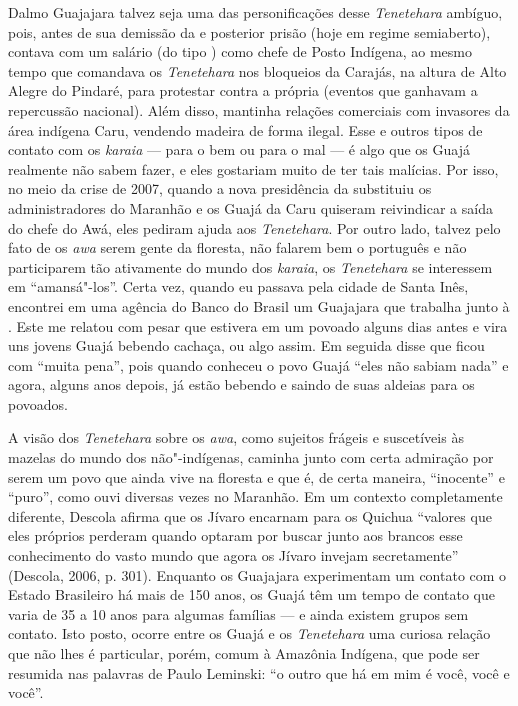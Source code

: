 Dalmo Guajajara talvez seja uma das personificações desse
\emph{Tenetehara} ambíguo, pois, antes de sua demissão da  e
posterior prisão (hoje em regime semiaberto), contava com um salário (do
tipo ) como chefe de Posto Indígena, ao mesmo tempo que comandava os
\emph{Tenetehara} nos bloqueios da  Carajás, na altura de Alto Alegre
do Pindaré, para protestar contra a própria  (eventos que ganhavam
a repercussão nacional). Além disso, mantinha relações comerciais com
invasores da área indígena Caru, vendendo madeira de forma ilegal. Esse
e outros tipos de contato com os \emph{karaia} --- para o bem ou para o
mal --- é algo que os Guajá realmente não sabem fazer, e eles gostariam
muito de ter tais malícias. Por isso, no meio da crise de 2007, quando a
nova presidência da  substituiu os administradores do Maranhão e os
Guajá da  Caru quiseram reivindicar a saída do chefe do  Awá, eles
pediram ajuda aos \emph{Tenetehara}. Por outro lado, talvez pelo fato de
os \emph{awa} serem gente da floresta, não falarem bem o português e não
participarem tão ativamente do mundo dos \emph{karaia}, os
\emph{Tenetehara} se interessem em ``amansá"-los''. Certa vez, quando eu
passava pela cidade de Santa Inês, encontrei em uma agência do Banco do
Brasil um Guajajara que trabalha junto à . Este me relatou com
pesar que estivera em um povoado alguns dias antes e vira uns jovens
Guajá bebendo cachaça, ou algo assim. Em seguida disse que ficou com
``muita pena'', pois quando conheceu o povo Guajá ``eles não sabiam nada'' e
agora, alguns anos depois, já estão bebendo e saindo de suas aldeias
para os povoados.

A visão dos \emph{Tenetehara} sobre os \emph{awa}, como sujeitos frágeis
e suscetíveis às mazelas do mundo dos não"-indígenas, caminha junto com
certa admiração por serem um povo que ainda vive na floresta e que é, de
certa maneira, ``inocente'' e ``puro'', como ouvi diversas vezes no
Maranhão. Em um contexto completamente diferente, Descola afirma que os
Jívaro encarnam para os Quichua ``valores que eles próprios perderam
quando optaram por buscar junto aos brancos esse conhecimento do vasto
mundo que agora os Jívaro invejam secretamente'' (Descola, 2006, p. 301).
Enquanto os Guajajara experimentam um contato com o Estado Brasileiro há
mais de 150 anos, os Guajá têm um tempo de contato que varia de 35 a 10
anos para algumas famílias --- e ainda existem grupos sem contato. Isto
posto, ocorre entre os Guajá e os \emph{Tenetehara} uma curiosa relação
que não lhes é particular, porém, comum à Amazônia Indígena, que pode
ser resumida nas palavras de Paulo Leminski: ``o outro que há em mim é
você, você e você''.
